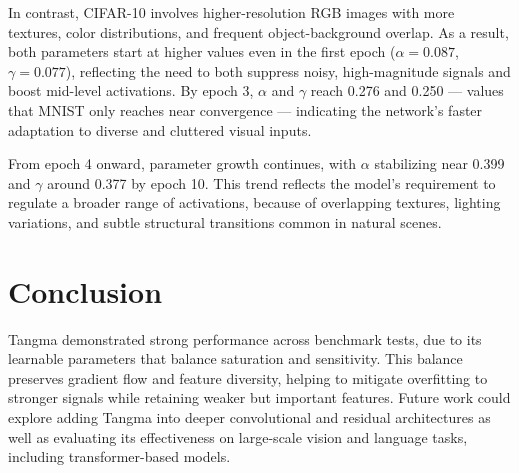 \documentclass{article}
\begin{document}
\vspace{4pt}

\noindent
In contrast, CIFAR-10 involves higher-resolution RGB images with more textures, color distributions, and frequent object-background overlap. As a result, both parameters start at higher values even in the first epoch ($\alpha = 0.087$, $\gamma = 0.077$), reflecting the need to both suppress noisy, high-magnitude signals and boost mid-level activations. By epoch 3, $\alpha$ and $\gamma$ reach 0.276 and 0.250 --- values that MNIST only reaches near convergence --- indicating the network’s faster adaptation to diverse and cluttered visual inputs.


\vspace{4pt}

\noindent
From epoch 4 onward, parameter growth continues, with $\alpha$ stabilizing near 0.399 and $\gamma$ around 0.377 by epoch 10. This trend reflects the model’s requirement to regulate a broader range of activations, because of overlapping textures, lighting variations, and subtle structural transitions common in natural scenes.































\section{Conclusion}
Tangma demonstrated strong performance across benchmark tests, due to its learnable parameters that balance saturation and sensitivity. This balance preserves gradient flow and feature diversity, helping to mitigate overfitting to stronger signals while retaining weaker but important features. Future work could explore adding Tangma into deeper convolutional and residual architectures as well as evaluating its effectiveness on large-scale vision and language tasks, including transformer-based models.



\end{document}
